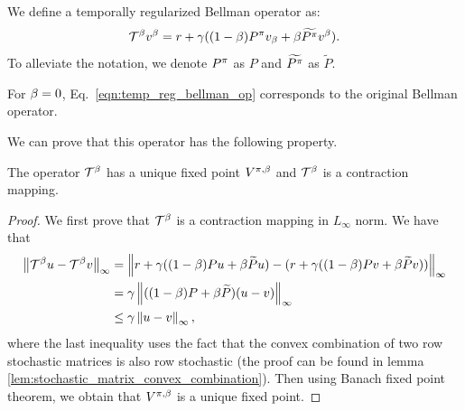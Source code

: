 We define a temporally regularized Bellman operator as:
\begin{equation}
\label{eqn:temp_reg_bellman_op}
    \mathcal{T}^{\beta} v^{\beta} = r + \gamma ((1-\beta) P^{\pi}v_{\beta} + \beta \widetilde{P^{\pi}} v^{\beta}).
\end{equation}
To alleviate the notation, we denote $P^{\pi}$ as $P$ and $\widetilde{P^{\pi}}$ as $\widetilde{P}$.
\begin{remark}
For $\beta =0$, Eq.~\ref{eqn:temp_reg_bellman_op} corresponds to the original Bellman operator.
\end{remark}
We can prove that this operator has the following property.
\begin{theorem}
The operator $\mathcal{T}^{\beta}$ has a unique fixed point $V^{\pi,\beta}$ and $\mathcal{T}^{\beta}$ is a contraction mapping.
\end{theorem}
\begin{proof}
We first prove that $\mathcal{T}^{\beta}$ is a contraction mapping in $L_\infty$ norm. We have that
\begin{equation}
\begin{split}
    \left\lVert\mathcal{T}^{\beta} u - \mathcal{T}^{\beta} v\right\rVert_{\infty} &= \left\lVert r+\gamma( (1-\beta) Pu + \beta \widetilde{P}u) - (r+\gamma( (1-\beta) Pv + \beta \widetilde{P}v))\right\rVert_{\infty}\\
    &= \gamma \left\lVert((1-\beta) P + \beta \widetilde{P})(u-v)\right\rVert_{\infty}\\
    &\leq \gamma \left\lVert u-v\right\rVert_{\infty},
\end{split}
\end{equation}
where the last inequality uses the fact that the convex combination of two row stochastic matrices is also row stochastic (the proof can be found in lemma \ref{lem:stochastic_matrix_convex_combination}).
Then using Banach fixed point theorem, we obtain that $V^{\pi,\beta}$ is a unique fixed point. 
\end{proof}

